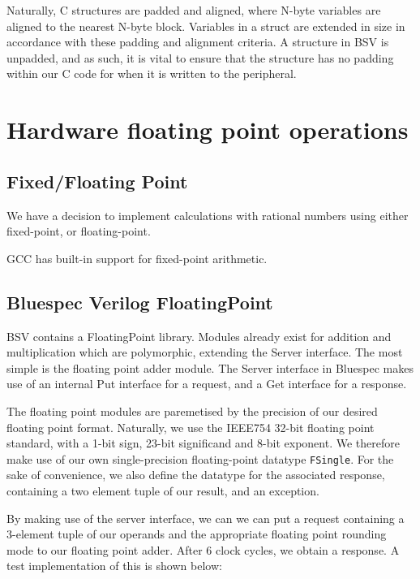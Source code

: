 \documentclass[a4paper,8pt]{report}
\begin{document}

Naturally, C structures are padded and aligned, where N-byte variables are
aligned to the nearest N-byte block. Variables in a struct are extended in size
in accordance with these padding and alignment criteria.
A structure in BSV is unpadded, and as such, it is vital to ensure that the
structure has no padding within our C code for when it is written to the
peripheral.


\section{Hardware floating point operations}
\subsection{Fixed/Floating Point}
We have a decision to implement calculations with rational numbers using either
fixed-point, or floating-point.


GCC has built-in support for fixed-point arithmetic.

\subsection{Bluespec Verilog FloatingPoint}
BSV contains a FloatingPoint library. Modules already exist for addition and
multiplication which are polymorphic, extending the Server interface. The most
simple is the floating point adder module. The Server interface in Bluespec
makes use of an internal Put interface for a request, and a Get interface for a
response.

The floating point modules are paremetised by the precision of our desired floating
point format. Naturally, we use the IEEE754 32-bit floating point standard, with a 1-bit sign,
23-bit significand and 8-bit exponent. We therefore make use of our own
single-precision floating-point datatype \texttt{FSingle}. For the sake of
convenience, we also define the datatype for the associated response, containing
a two element tuple of our result, and an exception.

By making use of the server interface, we can we can put a request containing a
3-element tuple of our operands and the appropriate floating point rounding mode
to our floating point adder. After 6 clock cycles, we obtain a response. A test
implementation of this is shown below: \\
\end{document}
